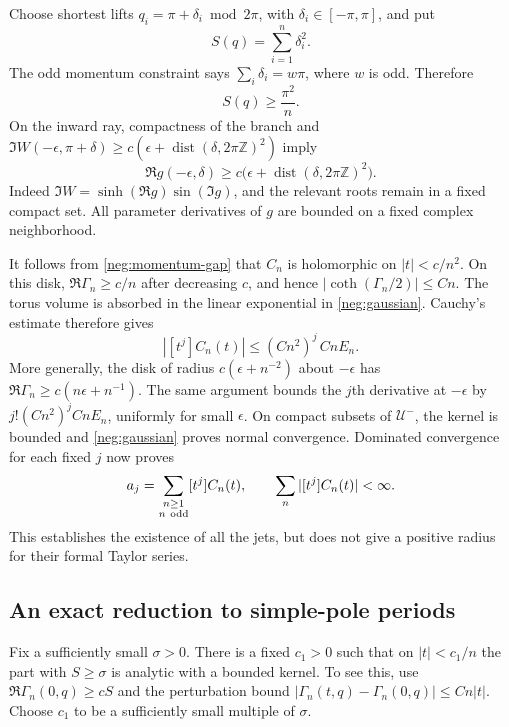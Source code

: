 \documentclass[11pt]{article}
\numberwithin{equation}{section}
\theoremstyle{definition}
\newcommand{\Z}{\mathbb Z}
\begin{document}
Choose shortest lifts \(q_i=\pi+\delta_i\bmod2\pi\), with
\(\delta_i\in[-\pi,\pi]\), and put
\[
 S(q)=\sum_{i=1}^n\delta_i^2 .
 \]
The odd momentum constraint says
\(\sum_i\delta_i=w\pi\), where \(w\) is odd.  Therefore
\begin{equation}
 S(q)\ge\frac{\pi^2}{n}.
 \label{neg:momentum-gap}
\end{equation}
On the inward ray, compactness of the branch and
\(\Im W(-\epsilon,\pi+\delta)\ge
c(\epsilon+\operatorname{dist}(\delta,2\pi\Z)^2)\) imply
\begin{equation}
 \Re g(-\epsilon,\delta)
 \ge c\bigl(\epsilon+\operatorname{dist}(\delta,2\pi\Z)^2\bigr).
 \label{neg:attenuation}
\end{equation}
Indeed \(\Im W=\sinh(\Re g)\sin(\Im g)\), and the relevant roots
remain in a fixed compact set.  All parameter derivatives of \(g\)
are bounded on a fixed complex neighborhood.

It follows from \eqref{neg:momentum-gap} that \(C_n\) is holomorphic
on \(|t|<c/n^2\).  On this disk,
\(\Re\Gamma_n\ge c/n\) after decreasing \(c\), and hence
\(|\coth(\Gamma_n/2)|\le Cn\).  The torus volume is absorbed in
the linear exponential in \eqref{neg:gaussian}.  Cauchy's estimate
therefore gives
\begin{equation}
 |[t^j]C_n(t)|\le (Cn^2)^j\,CnE_n .
 \label{neg:small-disk}
\end{equation}
More generally, the disk of radius \(c(\epsilon+n^{-2})\) about
\(-\epsilon\) has
\(\Re\Gamma_n\ge c(n\epsilon+n^{-1})\).  The same argument bounds
the \(j\)th derivative at \(-\epsilon\) by
\(j!(Cn^2)^j CnE_n\), uniformly for small \(\epsilon\).
On compact subsets of \(\mathcal U^-\), the kernel is bounded and
\eqref{neg:gaussian} proves normal convergence.  Dominated
convergence for each fixed \(j\) now proves
\begin{equation}
 a_j=\sum_{\substack{n\ge1\\n\ {\rm odd}}}[t^j]C_n(t),
 \qquad
 \sum_n |[t^j]C_n(t)|<\infty .
 \label{neg:jet-sum}
\end{equation}
This establishes the existence of all the jets, but does not give
a positive radius for their formal Taylor series.

\subsection{An exact reduction to simple-pole periods}
\label{neg:pole-reduction}

Fix a sufficiently small \(\sigma>0\).  There is a fixed \(c_1>0\)
such that on \(|t|<c_1/n\) the part with \(S\ge\sigma\) is analytic
with a bounded kernel.  To see this, use
\(\Re\Gamma_n(0,q)\ge cS\) and the perturbation bound
\(|\Gamma_n(t,q)-\Gamma_n(0,q)|\le Cn|t|\).
Choose \(c_1\) to be a sufficiently small multiple of \(\sigma\).
\end{document}
